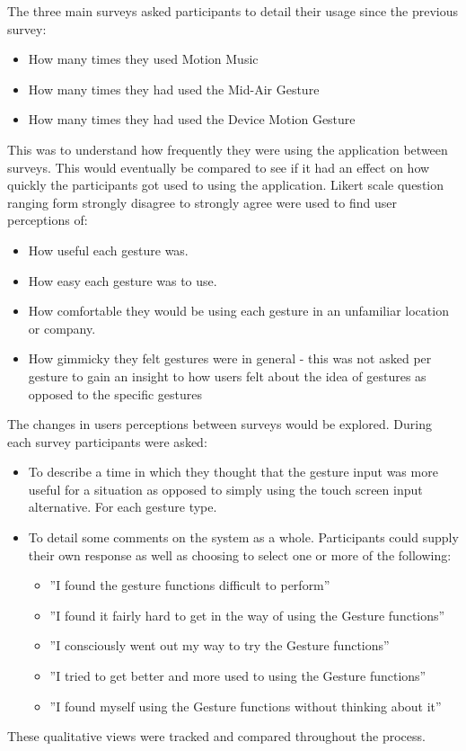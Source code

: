 \documentclass{l4proj}
\begin{document}
The three main surveys asked participants to detail their usage since the previous survey:
\begin{itemize}
    \item How many times they used Motion Music
    \item How many times they had used the Mid-Air Gesture
    \item How many times they had used the Device Motion Gesture
\end{itemize}
 This was to understand how frequently they were using the application between surveys. This would eventually be compared to see if it had an effect on how quickly the participants got used to using the application. 
 Likert scale question ranging form strongly disagree to strongly agree were used to find user perceptions of:
 \begin{itemize}
    \item How useful each gesture was.
    \item How  easy each gesture was to use.
    \item How comfortable they would be using each gesture in an unfamiliar location or company.
    \item How gimmicky they felt gestures were in general - this was not asked per gesture to gain an insight to how users felt about the idea of gestures as opposed to the specific gestures
\end{itemize}

 The changes in users perceptions between surveys would be explored. During each survey participants were asked: 
 \begin{itemize}
     \item To describe a time in which they thought that the gesture input was more useful for a situation as opposed to simply using the touch screen input alternative. For each gesture type.
     \item To detail some comments on the system as a whole. Participants could supply their own response as well  as choosing to select one or more of the following: \begin{itemize}
         \item ''I found the gesture functions difficult to perform''
         \item ''I found it fairly hard to get in the way of using the Gesture functions''
         \item ''I consciously went out my way to try the Gesture functions''
         \item ''I tried to get better and more used to using the Gesture functions''
         \item ''I found myself using the Gesture functions without thinking about it''
     \end{itemize}
 \end{itemize}
These qualitative views were tracked and compared throughout the process.
\end{document}
